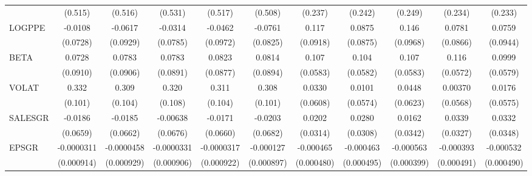 \begin{table}[htbp]
\begin{tabular}{l*{10}{c}}
                &  (0.515)         &  (0.516)         &  (0.531)         &  (0.517)         &  (0.508)         &  (0.237)         &  (0.242)         &  (0.249)         &  (0.234)         &  (0.233)         \\
LOGPPE          &  -0.0108         &  -0.0617         &  -0.0314         &  -0.0462         &  -0.0761         &    0.117         &   0.0875         &    0.146         &   0.0781         &   0.0759         \\
                & (0.0728)         & (0.0929)         & (0.0785)         & (0.0972)         & (0.0825)         & (0.0918)         & (0.0875)         & (0.0968)         & (0.0866)         & (0.0944)         \\
BETA            &   0.0728         &   0.0783         &   0.0783         &   0.0823         &   0.0814         &    0.107\sym{*}  &    0.104\sym{*}  &    0.107\sym{*}  &    0.116\sym{**} &   0.0999\sym{*}  \\
                & (0.0910)         & (0.0906)         & (0.0891)         & (0.0877)         & (0.0894)         & (0.0583)         & (0.0582)         & (0.0583)         & (0.0572)         & (0.0579)         \\
VOLAT           &    0.332\sym{***}&    0.309\sym{***}&    0.320\sym{***}&    0.311\sym{***}&    0.308\sym{***}&   0.0330         &   0.0101         &   0.0448         &  0.00370         &   0.0176         \\
                &  (0.101)         &  (0.104)         &  (0.108)         &  (0.104)         &  (0.101)         & (0.0608)         & (0.0574)         & (0.0623)         & (0.0568)         & (0.0575)         \\
SALESGR         &  -0.0186         &  -0.0185         & -0.00638         &  -0.0171         &  -0.0203         &   0.0202         &   0.0280         &   0.0162         &   0.0339         &   0.0332         \\
                & (0.0659)         & (0.0662)         & (0.0676)         & (0.0660)         & (0.0682)         & (0.0314)         & (0.0308)         & (0.0342)         & (0.0327)         & (0.0348)         \\
EPSGR           &-0.0000311         &-0.0000458         &-0.0000331         &-0.0000317         &-0.000127         &-0.000465         &-0.000463         &-0.000563         &-0.000393         &-0.000532         \\
                &(0.000914)         &(0.000929)         &(0.000906)         &(0.000922)         &(0.000897)         &(0.000480)         &(0.000495)         &(0.000399)         &(0.000491)         &(0.000490)         \\

\end{tabular}
\end{table}
